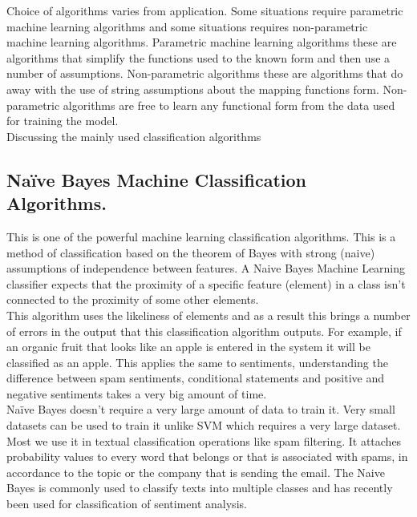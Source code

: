 \documentclass[12pt]{report}
\begin{document}
Choice of algorithms varies from application. Some situations require parametric machine learning algorithms and some situations requires non-parametric machine learning algorithms. Parametric machine learning algorithms these are algorithms that simplify the functions used to the known form and then use a number of assumptions. Non-parametric algorithms these are algorithms that do away with the use of string assumptions about the mapping functions form. Non-parametric algorithms are free to learn any functional form from the data used for training the model.\\
Discussing the mainly used classification algorithms
\subsection{Naïve Bayes Machine Classification Algorithms.}
This is one of the powerful machine learning classification algorithms. This is a method of classification based on the theorem of Bayes with strong (naive) assumptions of independence between features. A Naive Bayes Machine Learning classifier expects that the proximity of a specific feature (element) in a class isn’t connected to the proximity of some other elements.\\ 
This algorithm uses the likeliness of elements and as a result this brings a number of errors in the output that this classification algorithm outputs. For example, if an organic fruit that looks like an apple is entered in the system it will be classified as an apple. This applies the same to sentiments, understanding the difference between spam sentiments, conditional statements and positive and negative sentiments takes a very big amount of time.\\
Naïve Bayes doesn’t require a very large amount of data to train it. Very small datasets can be used to train it unlike SVM which requires a very large dataset.\\
Most we use it in textual classification operations like spam filtering. It attaches probability values to every word that belongs or that is associated with spams, in accordance to the topic or the company that is sending the email. The Naive Bayes is commonly used to classify texts into multiple classes and has recently been used for classification of sentiment analysis.\\
\end{document}
